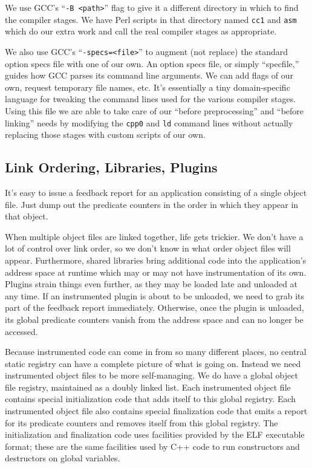 \documentclass[times,10pt,twocolumn]{article}
\begin{document}
We use GCC's ``\texttt{-B <path>}'' flag to give it a different
directory in which to find the compiler stages.  We have Perl scripts
in that directory named \texttt{cc1} and \texttt{asm} which do our
extra work and call the real compiler stages as appropriate.

We also use GCC's ``\texttt{-specs=<file>}'' to augment (not replace)
the standard option specs file with one of our own.  An option specs
file, or simply ``specfile,'' guides how GCC parses its command line
arguments.  We can add flags of our own, request temporary file names,
etc.  It's essentially a tiny domain-specific language for tweaking
the command lines used for the various compiler stages.  Using this
file we are able to take care of our ``before preprocessing'' and
``before linking'' needs by modifying the \texttt{cpp0} and
\texttt{ld} command lines without actually replacing those stages with
custom scripts of our own.

\subsection{Link Ordering, Libraries, Plugins}

It's easy to issue a feedback report for an application consisting of
a single object file.  Just dump out the predicate counters in the
order in which they appear in that object.

When multiple object files are linked together, life gets trickier.
We don't have a lot of control over link order, so we don't know in
what order object files will appear.  Furthermore, shared libraries
bring additional code into the application's address space at runtime
which may or may not have instrumentation of its own.  Plugins strain
things even further, as they may be loaded late and unloaded at any
time.  If an instrumented plugin is about to be unloaded, we need to
grab its part of the feedback report immediately.  Otherwise, once the
plugin is unloaded, its global predicate counters vanish from the
address space and can no longer be accessed.

Because instrumented code can come in from so many different places,
no central static registry can have a complete picture of what is
going on.  Instead we need instrumented object files to be more
self-managing.  We do have a global object file registry, maintained
as a doubly linked list.  Each instrumented object file contains
special initialization code that adds itself to this global registry.
Each instrumented object file also contains special finalization code
that emits a report for its predicate counters and removes itself from
this global registry.  The initialization and finalization code uses
facilities provided by the ELF executable format; these are the same
facilities used by C++ code to run constructors and destructors on
global variables.
\end{document}
